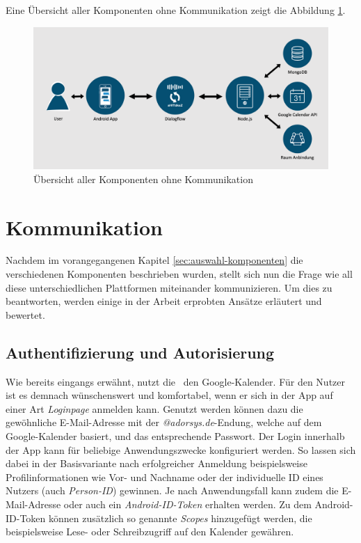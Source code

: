 Eine Übersicht aller Komponenten ohne Kommunikation zeigt die Abbildung \ref{fig:komponenten-v2}.
\newline

\begin{figure}[H]
    \centering
    \includegraphics[width=1\textwidth]{bilder/Komponenten-v2.png}
    \caption{Übersicht aller Komponenten ohne Kommunikation}
    \label{fig:komponenten-v2}
\end{figure}

\section{Kommunikation}
\label{sec:kommunikation}

Nachdem im vorangegangenen Kapitel \ref{sec:auswahl-komponenten} die verschiedenen Komponenten beschrieben wurden, stellt sich nun die Frage wie all diese unterschiedlichen Plattformen miteinander kommunizieren. Um dies zu beantworten, werden einige in der Arbeit erprobten Ansätze erläutert und bewertet. 

\subsection{Authentifizierung und Autorisierung}
\label{subsec:authentifizierung-authorisierung}

Wie bereits eingangs erwähnt, nutzt die \adorsys\ den Google-Kalender. Für den Nutzer ist es demnach wünschenswert und komfortabel, wenn er sich in der App auf einer Art \textit{Loginpage} anmelden kann. Genutzt werden können dazu die gewöhnliche E-Mail-Adresse mit der \textit{@adorsys.de}-Endung, welche auf dem Google-Kalender basiert, und das entsprechende Passwort. Der Login innerhalb der App kann für beliebige Anwendungszwecke konfiguriert werden. So lassen sich dabei in der Basisvariante nach erfolgreicher Anmeldung beispielsweise Profilinformationen wie Vor- und Nachname oder der individuelle \ac{ID} eines Nutzers (auch \textit{Person-\ac{ID}}) gewinnen. Je nach Anwendungsfall kann zudem die E-Mail-Adresse oder auch ein \textit{Android-\ac{ID}-Token} erhalten werden. Zu dem Android-\ac{ID}-Token können zusätzlich so genannte \textit{Scopes} hinzugefügt werden, die beispielsweise Lese- oder Schreibzugriff auf den Kalender gewähren. \cite{google_developers_integrating_2018} 

